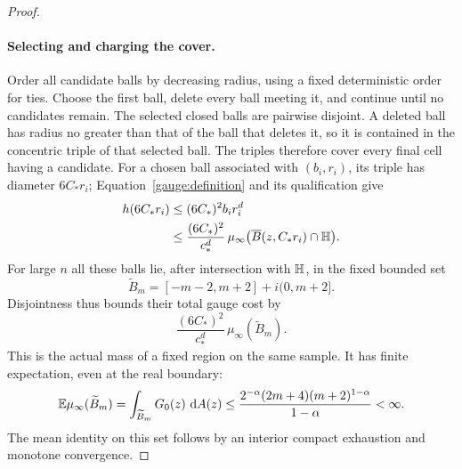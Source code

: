 \begin{proof}
\paragraph{Selecting and charging the cover.}
Order all candidate balls by
decreasing radius, using a fixed deterministic order for ties.
Choose the first ball, delete every ball meeting it, and
continue until no candidates remain. The selected closed balls
are pairwise disjoint. A deleted ball has radius no greater
than that of the ball that deletes it, so it is contained in
the concentric triple of that selected ball.
The triples therefore cover every final cell having a candidate.
For a chosen ball associated with \((b_i,r_i)\), its triple
has diameter \(6C_*r_i\); Equation~\eqref{gauge:definition}
and its qualification give
\begin{align}
 h(6C_*r_i)
 &\le (6C_*)^2 b_i r_i^d \notag\\
 &\le \frac{(6C_*)^2}{c_*^d}\,
       \mu_\infty\bigl(\overline B(z,C_*r_i)\cap\mathbb H\bigr).
 \label{hd:candidate-cost}
\end{align}
For large \(n\) all these balls lie, after intersection with
\(\mathbb H\), in the fixed bounded set
\[
 \widetilde B_m=[-m-2,m+2]+i(0,m+2].
\]
Disjointness thus bounds their total gauge cost by
\[
 \frac{(6C_*)^2}{c_*^d}\,\mu_\infty(\widetilde B_m).
\]
This is the actual mass of a fixed region on the same sample.
It has finite expectation, even at the real boundary:
\begin{equation}
 \mathbb E\mu_\infty(\widetilde B_m)
 =\int_{\widetilde B_m}G_0(z)\,\mathop{}\!\mathrm{d} A(z)
 \le \frac{2^{-\alpha}(2m+4)(m+2)^{1-\alpha}}{1-\alpha}
 <\infty.
 \label{hd:boundary-integrability}
\end{equation}
The mean identity on this set follows by an interior compact
exhaustion and monotone convergence.


\end{proof}
